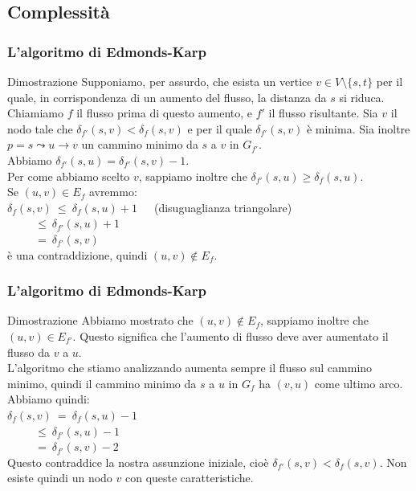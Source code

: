 \documentclass{beamer}
\begin{document}
\subsection{Complessità}

\begin{frame}
\frametitle{L'algoritmo di Edmonds-Karp}
\begin{block}{Dimostrazione}
Supponiamo, per assurdo, che esista un vertice $v\in V\setminus\{s,t\}$ per il quale, in corrispondenza di un aumento del flusso, la distanza da $s$ si riduca. Chiamiamo $f$ il flusso prima di questo aumento, e $f'$ il flusso risultante. Sia $v$ il nodo tale che $\delta_{f'}(s,v)<\delta_f(s,v)$ e per il quale $\delta_{f'}(s,v)$ è minima. Sia inoltre $p=s\leadsto u\rightarrow v$ un cammino minimo da $s$ a $v$ in $G_{f'}$.\\
Abbiamo $\delta_{f'}(s,u)=\delta_{f'}(s,v)-1$.\\
Per come abbiamo scelto $v$, sappiamo inoltre che $\delta_{f'}(s,u)\geq \delta_f(s,u)$.\\
Se $(u,v)\in E_{f}$ avremmo:\\
$\delta_f(s,v)\ \leq\ \delta_f(s,u)+1$\ \ \ (disuguaglianza triangolare)\\
$\ \ \ \ \ \ \ \ \ \ \ \leq\ \delta_{f'}(s,u)+1$\\
$\ \ \ \ \ \ \ \ \ \ \ =\ \delta_{f'}(s,v)$\\
è una contraddizione, quindi $(u,v)\not\in E_f$.
\end{block}
\end{frame}

\begin{frame}
\frametitle{L'algoritmo di Edmonds-Karp}
\begin{block}{Dimostrazione}
Abbiamo mostrato che $(u,v)\not\in E_f$, sappiamo inoltre che $(u,v)\in E_{f'}$. Questo significa che l'aumento di flusso deve aver aumentato il flusso da $v$ a $u$.\\
L'algoritmo che stiamo analizzando aumenta sempre il flusso sul cammino minimo, quindi il cammino minimo da $s$ a $u$ in $G_f$ ha $(v,u)$ come ultimo arco. Abbiamo quindi:\\
$\delta_f(s,v)\ =\ \delta_f(s,u)-1$\\
$\ \ \ \ \ \ \ \ \ \ \ \leq\ \delta_{f'}(s,u)-1$\\
$\ \ \ \ \ \ \ \ \ \ \ =\ \delta_{f'}(s,v)-2$\\
Questo contraddice la nostra assunzione iniziale, cioè $\delta_{f'}(s,v)<\delta_f(s,v)$. Non esiste quindi un nodo $v$ con queste caratteristiche.
\end{block}
\end{frame}
\end{document}
